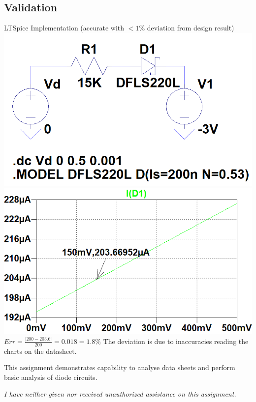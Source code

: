 \documentclass[12pt,letterpaper,titlepage]{article}
\begin{document}
\begin{raggedright}
\subsection{Validation}

\begin{center}
LTSpice Implementation (accurate with $< 1\%$ deviation from design result)
\includegraphics[width=.49\textwidth, height=\textheight, keepaspectratio=true]{ds2b}
\includegraphics[width=.49\textwidth, height=\textheight, keepaspectratio=true]{ds2c}
$Err = \frac{|200-203.6|}{200} = 0.018 = 1.8\%$ The deviation is due to inaccuracies reading the charts on the datasheet.
\end{center}

This assignment demonstrates capability to analyse data sheets and perform basic analysis of diode circuits.

\textit{I have neither given nor received unauthorized assistance on this assignment.}


\end{raggedright}
\end{document}
